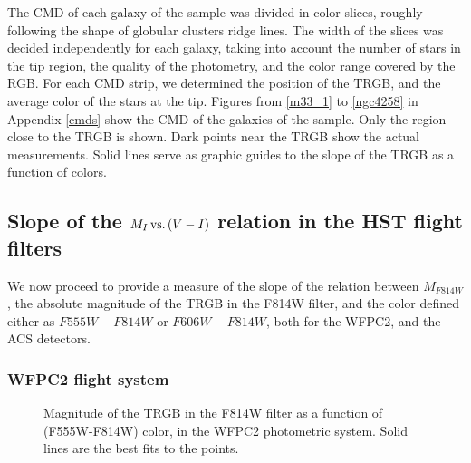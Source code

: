 \documentclass[11pt,preprint2]{aastex}
\begin{document}
The CMD of each galaxy of the sample was divided in color slices, roughly following the shape of globular clusters ridge lines. The width of the slices was decided independently for each galaxy, taking into account the number of stars in the tip region, the quality of the photometry, and the color range covered by the RGB. For each CMD strip, we determined the position of the TRGB, and the average color of the stars at the tip. Figures from \ref{m33_1} to \ref{ngc4258} in Appendix \ref{cmds} show the CMD of the galaxies of the sample. Only the region close to the TRGB is shown. Dark points near the TRGB show the actual measurements.  Solid lines serve as  graphic guides to the slope of the TRGB as a function of colors.



\subsection{Slope of the $M_I \, {\rm vs.}\, (V-I)$ relation in the HST flight filters}
\label{slope}


We now proceed to provide a measure of the slope of the relation between $M_{F814W}$, the absolute magnitude of the TRGB in the F814W filter, and the color defined either as $F555W-F814W$ or $F606W-F814W$, both for the WFPC2, and the ACS detectors.

\subsubsection{WFPC2 flight system}

\begin{figure}
\caption{Magnitude of the TRGB in the F814W filter as a function of (F555W-F814W) color, in the WFPC2  photometric system. Solid lines are the best fits to the points.\label{slope555_wfpc2}}
\end{figure}
\end{document}
